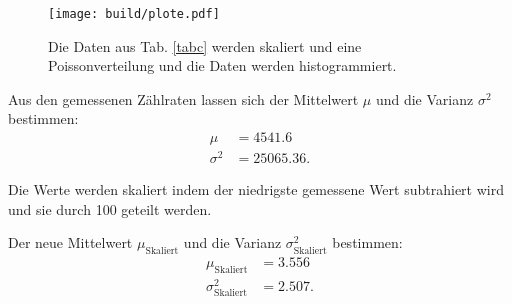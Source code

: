 \begin{figure}
    \centering
    \texttt{[image: build/plote.pdf]}
    \caption{Die Daten aus Tab. \ref{tabc} werden skaliert und eine Poissonverteilung und die Daten werden histogrammiert.}
    \label{fig:histogramm2}
\end{figure}
\noindent Aus den gemessenen Zählraten lassen sich der  Mittelwert $\mu$ und die Varianz $\sigma^2$ bestimmen: %
\begin{align*}
    \mu &= \num{4541.6} \\
    \sigma^2 &= \num{25065.36}.
\end{align*}

\noindent Die Werte werden skaliert indem der niedrigste gemessene Wert subtrahiert wird und sie durch \num{100} geteilt werden. 

\noindent Der neue Mittelwert $\mu_\text{Skaliert}$ und die Varianz $\sigma^2_\text{Skaliert}$ bestimmen: %
\begin{align*}
    \mu_\text{Skaliert} &= \num{3.556} \\
    \sigma^2_\text{Skaliert} &= \num{2.507}.
\end{align*}

